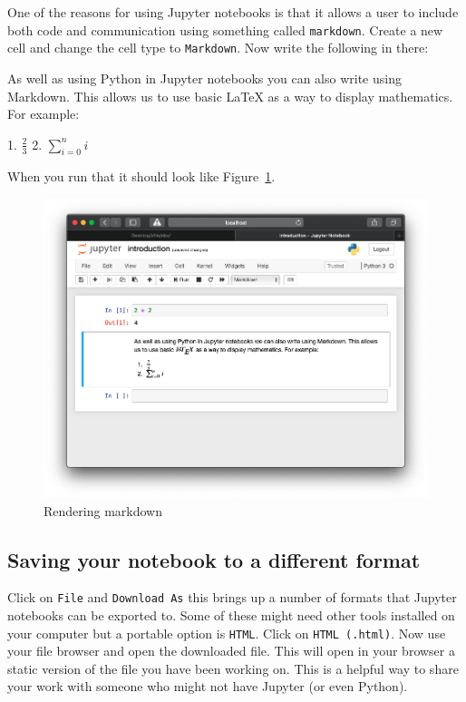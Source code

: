 One of the reasons for using Jupyter notebooks is that it allows a user to include
both code and communication using something called \texttt{markdown}.
Create a new cell and change the cell type to \texttt{Markdown}. Now write the
following in there:

\begin{md}
As well as using Python in Jupyter notebooks you can also write using 
Markdown. This allows us to use basic \LaTeX\; as a way to display 
mathematics. For example:

1. $\frac{2}{3}$
2. $\sum_{i=0}^n i$
\end{md}

When you run that it should look like Figure~\ref{fig:rendering_markdown}.

\begin{figure}[htbp]
\centering
    \includegraphics[width=0.750\linewidth]{assets/rendering_markdown/main.png}
    \caption{Rendering markdown}\label{fig:rendering_markdown}
\end{figure}

\subsection{Saving your notebook to a different format}

Click on \texttt{File} and \texttt{Download As} this brings up a number of formats that
Jupyter notebooks can be exported to. Some of these might need other tools
installed on your computer but a portable option is \texttt{HTML}.
Click on \texttt{HTML (.html)}.
Now use your file browser and open the downloaded file. This will open in your
browser a static version of the file you have been working on. This is a helpful
way to share your work with someone who might not have Jupyter (or even Python).

